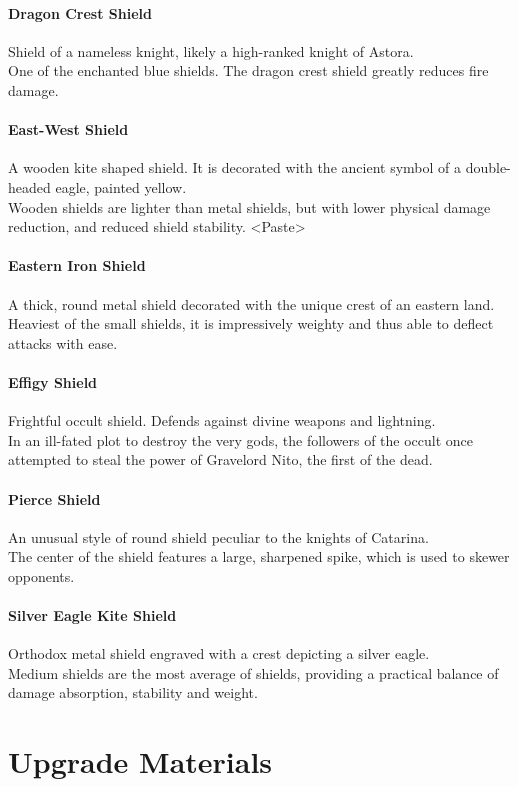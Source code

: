 \documentclass[twocolumn,a4paper]{article}
\begin{document}
\paragraph{Dragon Crest Shield}
Shield of a nameless knight, likely a high-ranked knight of Astora.\\
One of the enchanted blue shields. The dragon crest shield greatly reduces fire damage.
\paragraph{East-West Shield}
A wooden kite shaped shield. It is decorated with the ancient symbol of a double-headed eagle, painted yellow.\\
Wooden shields are lighter than metal shields, but with lower physical damage reduction, and reduced shield stability. <Paste>
\paragraph{Eastern Iron Shield}
A thick, round metal shield decorated with the unique crest of an eastern land.\\
Heaviest of the small shields, it is impressively weighty and thus able to deflect attacks with ease.
\paragraph{Effigy Shield}
Frightful occult shield. Defends against divine weapons and lightning.\\
In an ill-fated plot to destroy the very gods, the followers of the occult once attempted to steal the power of Gravelord Nito, the first of the dead.
\paragraph{Pierce Shield}
An unusual style of round shield peculiar to the knights of Catarina.\\
The center of the shield features a large, sharpened spike, which is used to skewer opponents.
\paragraph{Silver Eagle Kite Shield}
Orthodox metal shield engraved with a crest depicting a silver eagle.\\
Medium shields are the most average of shields, providing a practical balance of damage absorption, stability and weight.
\section*{Upgrade Materials}
\end{document}
